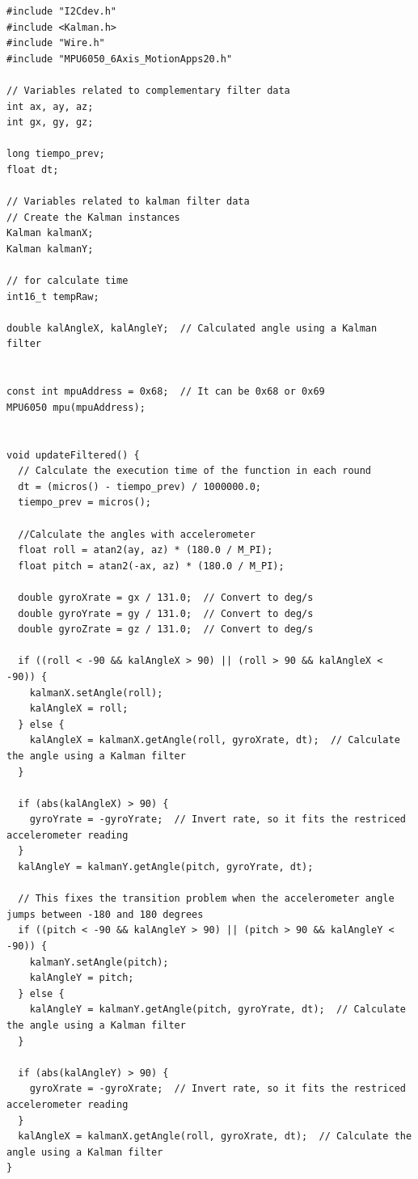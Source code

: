 \documentclass[conference]{IEEEtran}
\begin{document}
\begin{lstlisting}[style=Arduino]
#include "I2Cdev.h"
#include <Kalman.h>
#include "Wire.h"
#include "MPU6050_6Axis_MotionApps20.h"

// Variables related to complementary filter data
int ax, ay, az;
int gx, gy, gz;

long tiempo_prev;
float dt;

// Variables related to kalman filter data
// Create the Kalman instances
Kalman kalmanX;
Kalman kalmanY;

// for calculate time
int16_t tempRaw;

double kalAngleX, kalAngleY;  // Calculated angle using a Kalman filter


const int mpuAddress = 0x68;  // It can be 0x68 or 0x69
MPU6050 mpu(mpuAddress);


void updateFiltered() {
  // Calculate the execution time of the function in each round
  dt = (micros() - tiempo_prev) / 1000000.0;
  tiempo_prev = micros();

  //Calculate the angles with accelerometer
  float roll = atan2(ay, az) * (180.0 / M_PI);
  float pitch = atan2(-ax, az) * (180.0 / M_PI);

  double gyroXrate = gx / 131.0;  // Convert to deg/s
  double gyroYrate = gy / 131.0;  // Convert to deg/s
  double gyroZrate = gz / 131.0;  // Convert to deg/s

  if ((roll < -90 && kalAngleX > 90) || (roll > 90 && kalAngleX < -90)) {
    kalmanX.setAngle(roll);
    kalAngleX = roll;
  } else {
    kalAngleX = kalmanX.getAngle(roll, gyroXrate, dt);  // Calculate the angle using a Kalman filter
  }

  if (abs(kalAngleX) > 90) {
    gyroYrate = -gyroYrate;  // Invert rate, so it fits the restriced accelerometer reading
  }
  kalAngleY = kalmanY.getAngle(pitch, gyroYrate, dt);

  // This fixes the transition problem when the accelerometer angle jumps between -180 and 180 degrees
  if ((pitch < -90 && kalAngleY > 90) || (pitch > 90 && kalAngleY < -90)) {
    kalmanY.setAngle(pitch);
    kalAngleY = pitch;
  } else {
    kalAngleY = kalmanY.getAngle(pitch, gyroYrate, dt);  // Calculate the angle using a Kalman filter
  }

  if (abs(kalAngleY) > 90) {
    gyroXrate = -gyroXrate;  // Invert rate, so it fits the restriced accelerometer reading
  }
  kalAngleX = kalmanX.getAngle(roll, gyroXrate, dt);  // Calculate the angle using a Kalman filter
}



\end{lstlisting}
\end{document}
